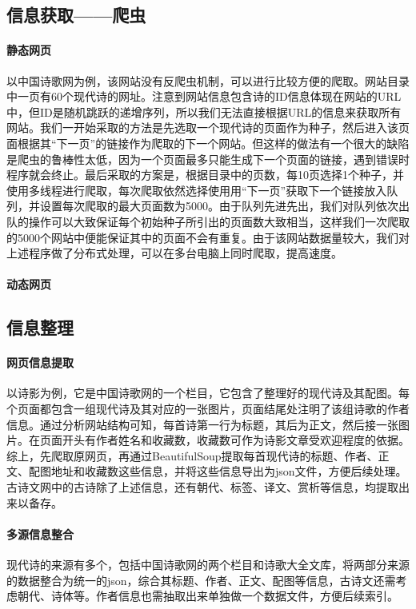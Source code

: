 \documentclass[a4paper, 10pt]{article}
\begin{document}
\subsection{信息获取——爬虫}
\paragraph{静态网页}
以中国诗歌网为例，该网站没有反爬虫机制，可以进行比较方便的爬取。网站目录中一页有60个现代诗的网址。注意到网站信息包含诗的ID信息体现在网站的URL中，但ID是随机跳跃的递增序列，所以我们无法直接根据URL的信息来获取所有网站。我们一开始采取的方法是先选取一个现代诗的页面作为种子，然后进入该页面根据其“下一页”的链接作为爬取的下一个网站。但这样的做法有一个很大的缺陷是爬虫的鲁棒性太低，因为一个页面最多只能生成下一个页面的链接，遇到错误时程序就会终止。最后采取的方案是，根据目录中的页数，每10页选择1个种子，并使用多线程进行爬取，每次爬取依然选择使用用“下一页”获取下一个链接放入队列，并设置每次爬取的最大页面数为5000。由于队列先进先出，我们对队列依次出队的操作可以大致保证每个初始种子所引出的页面数大致相当，这样我们一次爬取的5000个网站中便能保证其中的页面不会有重复。由于该网站数据量较大，我们对上述程序做了分布式处理，可以在多台电脑上同时爬取，提高速度。

\paragraph{动态网页}

\subsection{信息整理}
\paragraph{网页信息提取}
以诗影为例，它是中国诗歌网的一个栏目，它包含了整理好的现代诗及其配图。每个页面都包含一组现代诗及其对应的一张图片，页面结尾处注明了该组诗歌的作者信息。通过分析网站结构可知，每首诗第一行为标题，其后为正文，然后接一张图片。在页面开头有作者姓名和收藏数，收藏数可作为诗影文章受欢迎程度的依据。综上，先爬取原网页，再通过BeautifulSoup提取每首现代诗的标题、作者、正文、配图地址和收藏数这些信息，并将这些信息导出为json文件，方便后续处理。古诗文网中的古诗除了上述信息，还有朝代、标签、译文、赏析等信息，均提取出来以备存。

\paragraph{多源信息整合}
现代诗的来源有多个，包括中国诗歌网的两个栏目和诗歌大全文库，将两部分来源的数据整合为统一的json，综合其标题、作者、正文、配图等信息，古诗文还需考虑朝代、诗体等。作者信息也需抽取出来单独做一个数据文件，方便后续索引。
\end{document}
